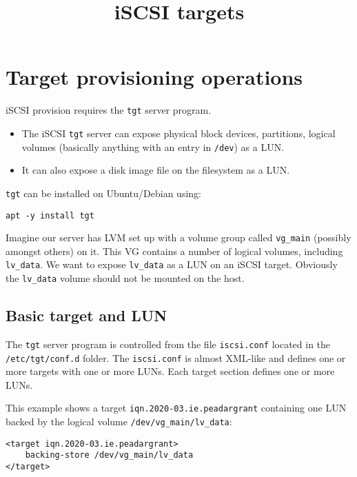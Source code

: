 \documentclass[slides]{pgnotes}
\title{iSCSI targets}
\begin{document}
\maketitle

\section{Target provisioning
operations}\label{target-provisioning-operations}

iSCSI provision requires the \texttt{tgt} server program.
\begin{itemize}
  \item The iSCSI \texttt{tgt} server can expose physical block devices, partitions,
logical volumes (basically anything with an entry in \texttt{/dev}) as a
LUN.
\item It can also expose a disk image file on the filesystem as a LUN.
\end{itemize}

\texttt{tgt} can be installed on Ubuntu/Debian using:

\begin{verbatim}
apt -y install tgt
\end{verbatim}


Imagine our server has LVM set up with a volume group called
\texttt{vg\_main} (possibly amongst others) on it. This VG contains a
number of logical volumes, including \texttt{lv\_data}. We want to
expose \texttt{lv\_data} as a LUN on an iSCSI target. Obviously the
\texttt{lv\_data} volume should not be mounted on the host.

\subsection{Basic target and LUN}\label{basic-target-and-lun}

The \texttt{tgt} server program is controlled from the file
\texttt{iscsi.conf} located in the \texttt{/etc/tgt/conf.d} folder. The
\texttt{iscsi.conf} is almost XML-like and defines one or more targets
with one or more LUNs. Each target section defines one or more LUNs.

This example shows a target \texttt{iqn.2020-03.ie.peadargrant}
containing one LUN backed by the logical volume
\texttt{/dev/vg\_main/lv\_data}:

\begin{verbatim}
<target iqn.2020-03.ie.peadargrant>
    backing-store /dev/vg_main/lv_data
</target>
\end{verbatim}
\end{document}
